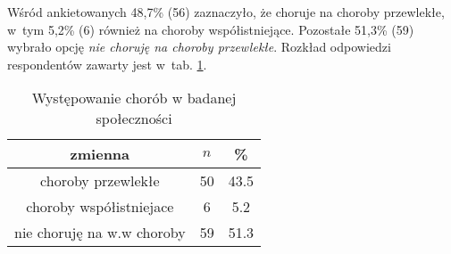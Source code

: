 Wśród ankietowanych 48,7\% (56) zaznaczyło, że choruje na choroby przewlekłe, w~tym 5,2\% (6) również na choroby współistniejące. Pozostałe 51,3\% (59) wybrało opcję  \textit{nie choruję na choroby przewlekłe}. Rozkład odpowiedzi respondentów zawarty jest w~tab. \ref{tab:Q33}.

\begin{table}[H]
\caption{Występowanie chorób w badanej społeczności}
\centering
\begin{tabular}{ | c | c | c |}
\hline
zmienna & $n$ & \% \\
\hline
choroby przewlekłe  &  50  & 43.5 \\
\hline
choroby współistniejace  &  6  & 5.2\\
\hline
nie choruję na w.w choroby  &  59  & 51.3 \\
\hline
\end{tabular}
\label{tab:Q33}
\end{table}
